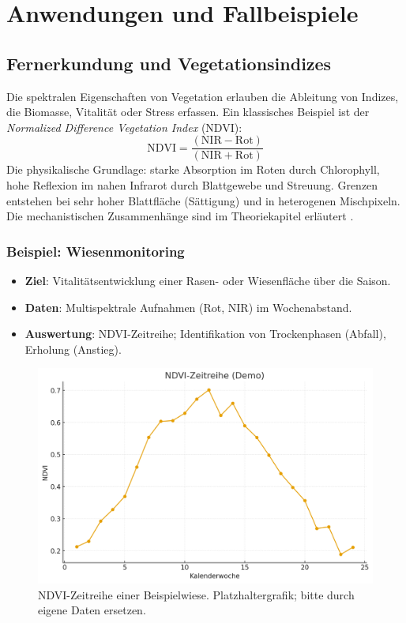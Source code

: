 \chapter{Anwendungen und Fallbeispiele}

\section{Fernerkundung und Vegetationsindizes}
Die spektralen Eigenschaften von Vegetation erlauben die Ableitung von Indizes, die Biomasse, Vitalität oder Stress erfassen. Ein klassisches Beispiel ist der \textit{Normalized Difference Vegetation Index} (NDVI):
\[
\mathrm{NDVI} = \frac{(\mathrm{NIR} - \mathrm{Rot})}{(\mathrm{NIR} + \mathrm{Rot})}
\]
Die physikalische Grundlage: starke Absorption im Roten durch Chlorophyll, hohe Reflexion im nahen Infrarot durch Blattgewebe und Streuung. Grenzen entstehen bei sehr hoher Blattfläche (Sättigung) und in heterogenen Mischpixeln. Die mechanistischen Zusammenhänge sind im Theoriekapitel erläutert \parencite{meyer2018photosynthese}.

\subsection{Beispiel: Wiesenmonitoring}
\begin{itemize}
  \item \textbf{Ziel}: Vitalitätsentwicklung einer Rasen- oder Wiesenfläche über die Saison.
  \item \textbf{Daten}: Multispektrale Aufnahmen (Rot, NIR) im Wochenabstand.
  \item \textbf{Auswertung}: NDVI-Zeitreihe; Identifikation von Trockenphasen (Abfall), Erholung (Anstieg).
\end{itemize}
\begin{figure}[H]
  \centering
  \includegraphics[width=.8\textwidth]{bilder/ndvi_demo.png}
  \caption{NDVI-Zeitreihe einer Beispielwiese. Platzhaltergrafik; bitte durch eigene Daten ersetzen.}
  \label{fig:ndvi}
\end{figure}

